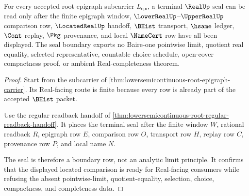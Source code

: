 \begin{theorem}
\label{thm:lowersemicontinuous-root-real-seal-boundary}
For every accepted root epigraph subcarrier $L_{\mathrm{epi}}$, a terminal $\RealUp$ seal can be read only after the finite epigraph window, $\LowerRealUp$--$\UpperRealUp$ comparison row, $\LocatedRealUp$ handoff, $\BHist$ transport, $\hsame$ ledger, $\Cont$ replay, $\Pkg$ provenance, and local $\NameCert$ row have all been displayed. The seal boundary exports no Baire-one pointwise limit, quotient real equality, selected representative, countable choice schedule, open-cover compactness proof, or ambient Real-completeness theorem.
\end{theorem}
\begin{proof}
Start from the subcarrier of \autoref{thm:lowersemicontinuous-root-epigraph-carrier}. Its Real-facing route is finite because every row is already part of the accepted $\BHist$ packet.

Use the regular readback handoff of \autoref{thm:lowersemicontinuous-root-regular-readback-handoff}. It places the terminal seal after the finite window $W$, rational readback $R$, epigraph row $E$, comparison row $O$, transport row $H$, replay row $C$, provenance row $P$, and local name $N$.

The seal is therefore a boundary row, not an analytic limit principle. It confirms that the displayed located comparison is ready for Real-facing consumers while refusing the absent pointwise-limit, quotient-equality, selection, choice, compactness, and completeness data.
\end{proof}

